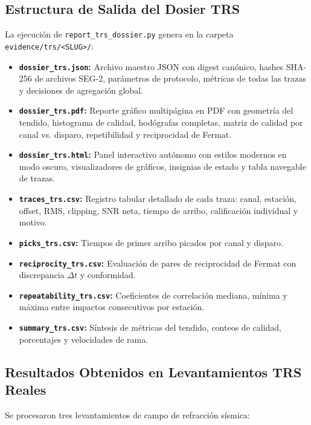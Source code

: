 \documentclass[11pt,a4paper]{article}
\begin{document}
\subsection{Estructura de Salida del Dosier TRS}
La ejecución de \texttt{report\_trs\_dossier.py} genera en la carpeta \texttt{evidence/trs/<SLUG>/}:
\begin{itemize}
    \item \textbf{\texttt{dossier\_trs.json}:} Archivo maestro JSON con digest canónico, hashes SHA-256 de archivos SEG-2, parámetros de protocolo, métricas de todas las trazas y decisiones de agregación global.
    \item \textbf{\texttt{dossier\_trs.pdf}:} Reporte gráfico multipágina en PDF con geometría del tendido, histograma de calidad, hodógrafas completas, matriz de calidad por canal vs. disparo, repetibilidad y reciprocidad de Fermat.
    \item \textbf{\texttt{dossier\_trs.html}:} Panel interactivo autónomo con estilos modernos en modo oscuro, visualizadores de gráficos, insignias de estado y tabla navegable de trazas.
    \item \textbf{\texttt{traces\_trs.csv}:} Registro tabular detallado de cada traza: canal, estación, offset, RMS, clipping, SNR neta, tiempo de arribo, calificación individual y motivo.
    \item \textbf{\texttt{picks\_trs.csv}:} Tiempos de primer arribo picados por canal y disparo.
    \item \textbf{\texttt{reciprocity\_trs.csv}:} Evaluación de pares de reciprocidad de Fermat con discrepancia $\Delta t$ y conformidad.
    \item \textbf{\texttt{repeatability\_trs.csv}:} Coeficientes de correlación mediana, mínima y máxima entre impactos consecutivos por estación.
    \item \textbf{\texttt{summary\_trs.csv}:} Síntesis de métricas del tendido, conteos de calidad, porcentajes y velocidades de rama.
\end{itemize}

\subsection{Resultados Obtenidos en Levantamientos TRS Reales}
Se procesaron tres levantamientos de campo de refracción sísmica:
\end{document}
